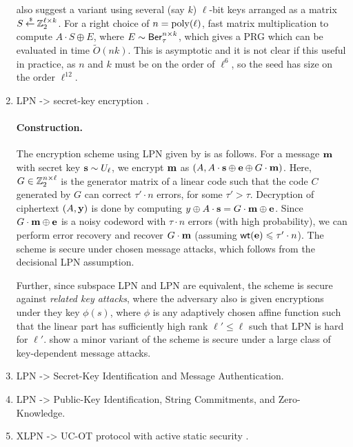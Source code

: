 \begin{enumerate}
	\cite{C:ACPS09} also suggest a variant using several (say $k$) $\ell$-bit keys arranged as a matrix $S \mathbin{\stackrel{\mbox{\,\tiny \$}}{\gets}} {\mathbb Z}^{\ell \times k}_2$.
	For a right choice of $n = \operatorname{poly}(\ell)$, fast matrix multiplication \cite{Coppersmith82} to compute $A\cdot S \oplus E$, where $E \sim \mathsf{Ber}_\tau^{n\times k}$, which gives a PRG which can be evaluated in time $\widetilde{O}(nk)$.
	This is asymptotic and it is not clear if this useful in practice, as $n$ and $k$ must be on the order of $\ell^6$, so the seed has size on the order $\ell^{12}$.
	
	\item LPN -> secret-key encryption \cite{ICALP:GilRobSeu08}.
	\paragraph{Construction.} The encryption scheme using LPN given by \cite{ICALP:GilRobSeu08} is as follows.
	For a message ${\mathbf m}$ with secret key ${\mathbf s} \sim U_\ell$, we encrypt ${\mathbf m}$ as $(A, A\cdot{\mathbf s} \oplus {\mathbf e} \oplus G\cdot {\mathbf m})$.
	Here, $G \in {\mathbb Z}_2^{n\times \ell}$ is the generator matrix of a linear code such that the code $C$ generated by $G$ can correct $\tau'\cdot n$ errors, for some $\tau' > \tau$.
	Decryption of ciphertext $(A, {\mathbf y})$ is done by computing $y \oplus A\cdot{\mathbf s} = G\cdot {\mathbf m} \oplus {\mathbf e}$.
	Since $G\cdot {\mathbf m} \oplus {\mathbf e}$ is a noisy codeword with $\tau \cdot n$ errors (with high probability), we can perform error recovery and recover $G\cdot {\mathbf m}$ (assuming $\mathsf{wt}({\mathbf e}) \leqslant \tau'\cdot n$).
	The scheme is secure under chosen message attacks, which follows from the decisional LPN assumption.
	
	Further, since subspace LPN and LPN are equivalent, the scheme is secure against {\em related key attacks}, where the adversary also is given encryptions under they key $\phi(s)$, where $\phi$ is any adaptively chosen affine function such that the linear part has sufficiently high rank $\ell' \leq \ell$ such that LPN is hard for $\ell'$.
	\cite{C:ACPS09} show a minor variant of the scheme is secure under a large class of key-dependent message attacks.
	
	\item LPN -> Secret-Key Identification and Message Authentication.
	
	\item LPN -> Public-Key Identification, String Commitments, and Zero-Knowledge.
	
	\item XLPN -> UC-OT protocol with active static security \cite{BerDowNas14}.

\end{enumerate}
